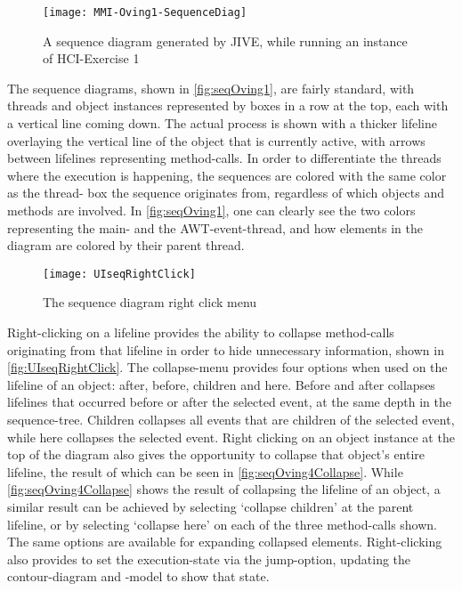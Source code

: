 \begin{figure}[H]
	\centering
	\texttt{[image: MMI-Oving1-SequenceDiag]}
	\caption{A sequence diagram generated by JIVE, while running an instance of HCI-Exercise 1}
	\label{fig:seqOving1}
\end{figure}
The sequence diagrams, shown in \autoref{fig:seqOving1}, are fairly standard, with threads and object instances represented by boxes in a row at the top, each with a vertical line coming down.
The actual process is shown with a thicker lifeline overlaying the vertical line of the object that is currently active, with arrows between lifelines representing method-calls.
In order to differentiate the threads where the execution is happening, the sequences are colored with the same color as the thread- box the sequence originates from, regardless of which objects and methods are involved.
In \autoref{fig:seqOving1}, one can clearly see the two colors representing the main- and the AWT-event-thread, and how elements in the diagram are colored by their parent thread.
\begin{figure}[H]
	\centering
	\texttt{[image: UIseqRightClick]}
	\caption{The sequence diagram right click menu}
	\label{fig:UIseqRightClick}
\end{figure}
Right-clicking on a lifeline provides the ability to collapse method-calls originating from that lifeline in order to hide unnecessary information, shown in \autoref{fig:UIseqRightClick}.
The collapse-menu provides four options when used on the lifeline of an object: after, before, children and here.
Before and after collapses lifelines that occurred before or after the selected event, at the same depth in the sequence-tree.
Children collapses all events that are children of the selected event, while here collapses the selected event.
Right clicking on an object instance at the top of the diagram also gives the opportunity to collapse that object's entire lifeline, the result of which can be seen in \autoref{fig:seqOving4Collapse}.
While \autoref{fig:seqOving4Collapse} shows the result of collapsing the lifeline of an object, a similar result can be achieved by selecting `collapse children' at the parent lifeline, or by selecting `collapse here' on each of the three method-calls shown.
The same options are available for expanding collapsed elements.
Right-clicking also provides to set the execution-state via the jump-option, updating the contour-diagram and -model to show that state.



